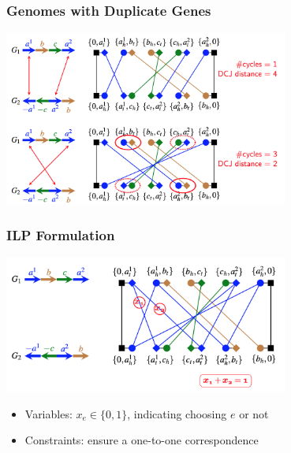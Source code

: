 \documentclass[mathserif]{beamer}
\begin{document}
\frame
{
	\frametitle{Genomes with Duplicate Genes}

	\begin{center}
		\includegraphics[width=0.7\textwidth]{L8-DCJ6.png}
	\end{center}

}

\frame
{
	\frametitle{ILP Formulation}

	\begin{center}
		\includegraphics[width=0.7\textwidth]{L8-DCJ7.png}
	\end{center}

	\begin{itemize}
	\item<1-> Variables: $x_e\in\{0,1\}$, indicating choosing $e$ or not
	\vspace{0.1cm}
	\item<1-> Constraints: ensure a one-to-one correspondence
	\end{itemize}
}
\end{document}
